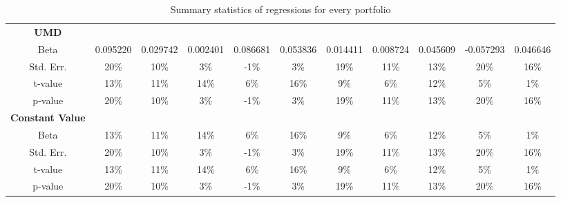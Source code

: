 \documentclass[11pt]{article}
\begin{document}
\begin{table}[H]
\begin{tabular}{ccccccccccc}
    \midrule
    \textbf{UMD} &  &  &  &  &  &  &  &  &  &  \\
    Beta & 0.095220 & 0.029742 & 0.002401 & 0.086681 & 0.053836 & 0.014411 & 0.008724 & 0.045609 & -0.057293 & 0.046646 \\
    Std. Err. & 20\% & 10\% & 3\% & -1\% & 3\% & 19\% & 11\% & 13\% & 20\% & 16\% \\
    t-value & 13\% & 11\% & 14\% & 6\% & 16\% & 9\% & 6\% & 12\% & 5\% & 1\% \\
    p-value & 20\% & 10\% & 3\% & -1\% & 3\% & 19\% & 11\% & 13\% & 20\% & 16\% \\
    \midrule
    \textbf{Constant Value} &  &  &  &  &  &  &  &  &  &  \\
    Beta & 13\% & 11\% & 14\% & 6\% & 16\% & 9\% & 6\% & 12\% & 5\% & 1\% \\
    Std. Err. & 20\% & 10\% & 3\% & -1\% & 3\% & 19\% & 11\% & 13\% & 20\% & 16\% \\
    t-value & 13\% & 11\% & 14\% & 6\% & 16\% & 9\% & 6\% & 12\% & 5\% & 1\% \\
    p-value & 20\% & 10\% & 3\% & -1\% & 3\% & 19\% & 11\% & 13\% & 20\% & 16\% \\
    \bottomrule
    \bottomrule
    \end{tabular}
    \caption{Summary statistics of regressions for every portfolio} 
    \label{tab:summary_reg}
\end{table}
\end{document}

